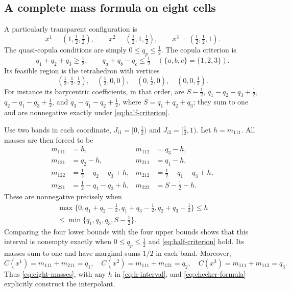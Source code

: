 \documentclass[a4paper,11pt]{amsart}
\numberwithin{equation}{section}
\theoremstyle{definition}
\theoremstyle{remark}
\begin{document}
\subsection{A complete mass formula on eight cells}\label{subsec:eight}
A particularly transparent configuration is
\begin{equation}
 x^1=(1,\tfrac12,\tfrac12),\qquad
 x^2=(\tfrac12,1,\tfrac12),\qquad
 x^3=(\tfrac12,\tfrac12,1).\label{eq:half-points}
\end{equation}
The quasi-copula conditions are simply $0\leq q_p\leq\tfrac12$.
The copula criterion is
\begin{equation}
 q_1+q_2+q_3\geq\tfrac12,\qquad
 q_a+q_b-q_c\leq\tfrac12\quad(\{a,b,c\}=\{1,2,3\}).
 \label{eq:half-criterion}
\end{equation}
Its feasible region is the tetrahedron with vertices
\[
 (\tfrac12,\tfrac12,\tfrac12),\quad
 (\tfrac12,0,0),\quad(0,\tfrac12,0),\quad(0,0,\tfrac12).
\]
For instance its barycentric coefficients, in that order, are
$S-\tfrac12$, $q_1-q_2-q_3+\tfrac12$,
$q_2-q_1-q_3+\tfrac12$, and $q_3-q_1-q_2+\tfrac12$,
where $S=q_1+q_2+q_3$; they sum to one and are nonnegative exactly under
\eqref{eq:half-criterion}.

Use two bands in each coordinate, $J_{i1}=[0,\tfrac12)$ and
$J_{i2}=[\tfrac12,1)$. Let $h=m_{111}$. All masses are then forced to be
\begin{equation}
\begin{aligned}
 m_{111}&=h, &m_{112}&=q_3-h,\\
 m_{121}&=q_2-h, &m_{211}&=q_1-h,\\
 m_{122}&=\tfrac12-q_2-q_3+h,
 &m_{212}&=\tfrac12-q_1-q_3+h,\\
 m_{221}&=\tfrac12-q_1-q_2+h,
 &m_{222}&=S-\tfrac12-h.
\end{aligned}\label{eq:eight-masses}
\end{equation}
These are nonnegative precisely when
\begin{equation}
 \begin{split}
 \max\{0,q_1+q_2-\tfrac12,q_1+q_3-\tfrac12,q_2+q_3-\tfrac12\}
 \leq h\\
 \leq\min\{q_1,q_2,q_3,S-\tfrac12\}.
 \end{split}\label{eq:h-interval}
\end{equation}
Comparing the four lower bounds with the four upper bounds shows that
this interval is nonempty exactly when $0\leq q_p\leq\tfrac12$ and
\eqref{eq:half-criterion} hold. Its masses sum to one and have marginal
sums $1/2$ in each band. Moreover,
\[
 C(x^1)=m_{111}+m_{211}=q_1,\quad
 C(x^2)=m_{111}+m_{121}=q_2,\quad
 C(x^3)=m_{111}+m_{112}=q_3.
\]
Thus \eqref{eq:eight-masses}, with any $h$ in \eqref{eq:h-interval},
and \eqref{eq:checker-formula} explicitly construct the interpolant.
\end{document}
